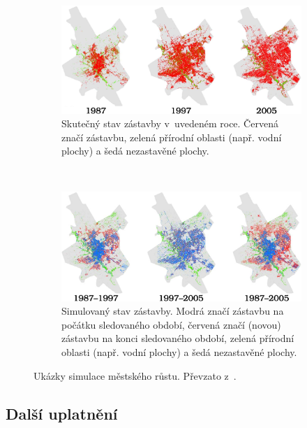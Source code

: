 \begin{figure}
    \begin{subfigure}[t]{\textwidth}
      \includegraphics[width=\textwidth]{genimg-urban-growt-city-1}
      \caption{Skutečný stav zástavby v~uvedeném roce. Červená značí zástavbu, zelená přírodní oblasti (např. vodní plochy) a šedá nezastavěné plochy.} 
    \end{subfigure}
    \\
    \begin{subfigure}[t]{\textwidth} \centering
      \includegraphics[width=\textwidth]{genimg-urban-growt-city-2}
      \caption{Simulovaný stav zástavby. Modrá značí zástavbu na počátku sledovaného období, červená značí (novou) zástavbu na konci sledovaného období, zelená přírodní oblasti (např. vodní plochy) a šedá nezastavěné plochy.} 
    \end{subfigure}

    \caption[Ukázky simulace městského růstu]{Ukázky simulace městského růstu. Převzato z~\cite{Ahm+-CalFuzCelAutModUrbDynSauAr}.} \label{img:UrbGroProSample}
\end{figure}

\subsection{Další uplatnění}

